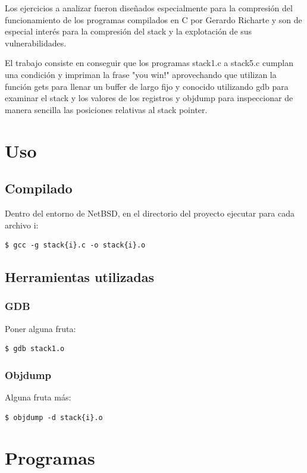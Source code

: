 \documentclass[a4paper,10pt]{article}
\begin{document}
Los ejercicios a analizar fueron diseñados especialmente para la compresión del funcionamiento de los programas compilados en C por Gerardo Richarte y son de especial interés para la compresión del stack y la explotación de sus vulnerabilidades.
\par El trabajo consiste en conseguir que los programas stack1.c a stack5.c cumplan una condición y impriman la frase "you win!" aprovechando que utilizan la función gets para llenar un buffer de largo fijo y conocido utilizando gdb para examinar el stack y los valores de los registros y objdump para inspeccionar de manera sencilla las posiciones relativas al stack pointer.


\newpage
\section{Uso}
\subsection{Compilado}
Dentro del entorno de NetBSD, en el directorio del proyecto ejecutar para cada archivo i:

\begin{verbatim}
$ gcc -g stack{i}.c -o stack{i}.o
\end{verbatim}

\subsection{Herramientas utilizadas}
\subsubsection{GDB}

Poner alguna fruta:

\begin{verbatim}
$ gdb stack1.o
\end{verbatim}

\subsubsection{Objdump}

Alguna fruta más:

\begin{verbatim}
$ objdump -d stack{i}.o
\end{verbatim}

\newpage
\section{Programas}
\end{document}
